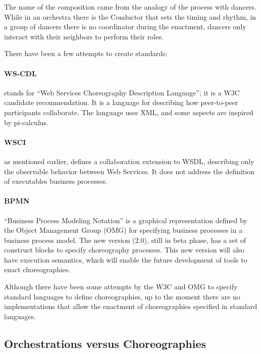 The name of the composition came from the analogy of the process with dancers. While in an orchestra there is the Conductor that sets the timing and rhythm, in a group of dancers there is no coordinator during the enactment, dancers only interact with their neighbors to perform their roles.

There have been a few attempts to create standards:

\paragraph{WS-CDL}
stands for ``Web Services Choreography Description Language''; it is a W3C candidate recommendation. It is a language for describing how peer-to-peer participants collaborate. The language uses XML, and some aspects are inspired by pi-calculus.

\paragraph{WSCI}
as mentioned earlier, defines a collaboration extension to WSDL, describing only the observable behavior between Web Services. It does not address the definition of executables business processes.

\paragraph{BPMN}
``Business Process Modeling Notation'' is a graphical representation defined by the Object Management Group (OMG) for specifying business processes in a business process model. The new version (2.0), still in beta phase, has a set of construct blocks to specify choreography processes. This new version will also have execution semantics, which will enable the future development of tools to enact choreographies.

Although there have been some attempts by the W3C and OMG to specify standard languages to define choreographies, up to the moment there are no implementations that allow the enactment of choreographies specified in standard languages.

\subsection{Orchestrations versus Choreographies}

